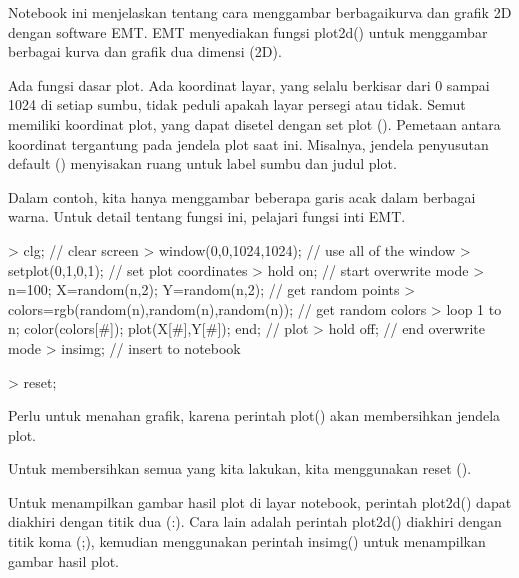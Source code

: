 \documentclass{report}
\begin{document}
\begin{eulernotebook}
\begin{eulercomment}
Notebook ini menjelaskan tentang cara menggambar berbagaikurva dan
grafik 2D dengan software EMT. EMT menyediakan fungsi plot2d() untuk
menggambar berbagai kurva dan grafik dua dimensi (2D).\\
\end{eulercomment}
\begin{eulercomment}
Ada fungsi dasar plot. Ada koordinat layar, yang selalu berkisar dari
0 sampai 1024 di setiap sumbu, tidak peduli apakah layar persegi atau
tidak. Semut memiliki koordinat plot, yang dapat disetel dengan set
plot (). Pemetaan antara koordinat tergantung pada jendela plot saat
ini. Misalnya, jendela penyusutan default () menyisakan ruang untuk
label sumbu dan judul plot.

Dalam contoh, kita hanya menggambar beberapa garis acak dalam berbagai
warna. Untuk detail tentang fungsi ini, pelajari fungsi inti EMT.
\end{eulercomment}
\begin{eulerprompt}
> clg; // clear screen
> window(0,0,1024,1024); // use all of the window
> setplot(0,1,0,1); // set plot coordinates
> hold on; // start overwrite mode
> n=100; X=random(n,2); Y=random(n,2);  // get random points
> colors=rgb(random(n),random(n),random(n)); // get random colors
> loop 1 to n; color(colors[#]); plot(X[#],Y[#]); end; // plot
> hold off; // end overwrite mode
> insimg; // insert to notebook
\end{eulerprompt}
\begin{eulerprompt}
> reset;
\end{eulerprompt}
\begin{eulercomment}
Perlu untuk menahan grafik, karena perintah plot() akan membersihkan
jendela plot.

Untuk membersihkan semua yang kita lakukan, kita menggunakan reset ().

Untuk menampilkan gambar hasil plot di layar notebook, perintah
plot2d() dapat diakhiri dengan titik dua (:). Cara lain adalah
perintah plot2d() diakhiri dengan titik koma (;), kemudian menggunakan
perintah insimg() untuk menampilkan gambar hasil plot.


\end{eulercomment}
\end{eulernotebook}
\end{document}
